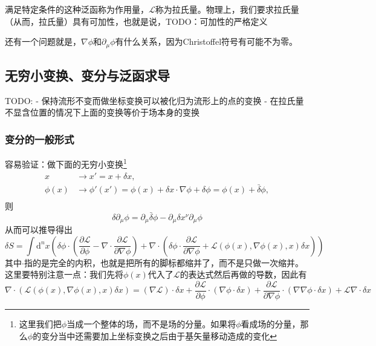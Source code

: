 \documentclass[UTF8, a4paper]{ctexart}
\begin{document}
满足特定条件的这种泛函称为作用量，$\mathcal{L}$称为拉氏量。物理上，我们要求拉氏量（从而，拉氏量）具有可加性，也就是说，TODO：可加性的严格定义

还有一个问题就是，$\nabla \phi$和$\partial_\mu \phi$有什么关系，因为Christoffel符号有可能不为零。

\subsection{无穷小变换、变分与泛函求导}
TODO:
- 保持流形不变而做坐标变换可以被化归为流形上的点的变换
- 在拉氏量不显含位置的情况下上面的变换等价于场本身的变换

\subsubsection{变分的一般形式}
容易验证：做下面的无穷小变换\footnote{这里我们把$\phi$当成一个整体的场，而不是场的分量。如果将$\phi$看成场的分量，那么$\phi$的变分当中还需要加上坐标变换之后由于基矢量移动造成的变化}
\begin{equation}
    \begin{aligned}
        x &\longrightarrow x' = x + \delta x, \\
        \phi(x) &\longrightarrow \phi'(x') = \phi(x) + \delta x \cdot \nabla \phi + \delta \phi = \phi(x) + \bar{\delta} \phi, \\
    \end{aligned}
\end{equation}
则
\begin{equation}
    \delta \partial_\mu \phi = \partial_\mu \bar{\delta} \phi - \partial_\mu \delta x^\nu \partial_\mu \phi
\end{equation}
从而可以推导得出
\begin{equation}
    \delta S = \int \mathrm{d}^n x \left( \delta \phi \cdot \left(\frac{\partial \mathcal{L}}{\partial \phi} - \nabla \cdot \frac{\partial \mathcal{L}}{\partial \nabla \phi} \right) + \nabla \cdot \left( \delta \phi \cdot \frac{\partial \mathcal{L}}{\partial \nabla \phi} + \mathcal{L}(\phi(x), \nabla \phi (x), x) \delta x \right) \right)
\end{equation}
其中$\cdot$指的是完全的内积，也就是把所有的脚标都缩并了，而不是只做一次缩并。
这里要特别注意一点：我们先将$\phi(x)$代入了$\mathcal{L}$的表达式然后再做的导数，因此有
\begin{equation}
    \nabla \cdot (\mathcal{L}(\phi(x), \nabla \phi (x), x) \delta x) = (\nabla \mathcal{L}) \cdot \delta x + \frac{\partial \mathcal{L}}{\partial \phi} \cdot (\nabla \phi \cdot \delta x) + \frac{\partial \mathcal{L}}{\partial \nabla \phi} \cdot (\nabla \nabla \phi \cdot \delta x) + \mathcal{L} \nabla \cdot \delta x
\end{equation}
\end{document}
